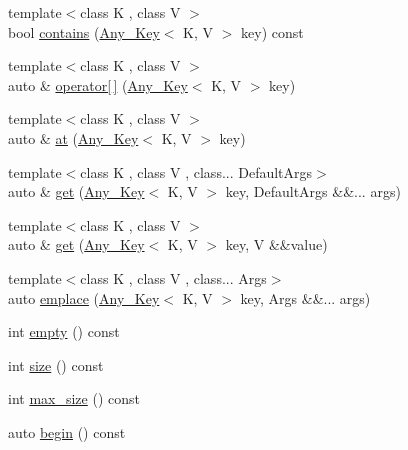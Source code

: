 \begin{DoxyCompactItemize}
\item 
{\footnotesize template$<$class K , class V $>$ }\\bool \hyperlink{classbc_1_1utility_1_1Any__Map_a63086bc45ee54ef2ca5ebc4dc0989332}{contains} (\hyperlink{structbc_1_1utility_1_1Any__Key}{Any\+\_\+\+Key}$<$ K, V $>$ key) const
\item 
{\footnotesize template$<$class K , class V $>$ }\\auto \& \hyperlink{classbc_1_1utility_1_1Any__Map_a8898f0b7810c617631176e8bafbd156d}{operator\mbox{[}$\,$\mbox{]}} (\hyperlink{structbc_1_1utility_1_1Any__Key}{Any\+\_\+\+Key}$<$ K, V $>$ key)
\item 
{\footnotesize template$<$class K , class V $>$ }\\auto \& \hyperlink{classbc_1_1utility_1_1Any__Map_aedde6d40e8c81b80d9f4f16a55c0fab2}{at} (\hyperlink{structbc_1_1utility_1_1Any__Key}{Any\+\_\+\+Key}$<$ K, V $>$ key)
\item 
{\footnotesize template$<$class K , class V , class... Default\+Args$>$ }\\auto \& \hyperlink{classbc_1_1utility_1_1Any__Map_a45119ffc4e78ca50dc4790c63cc42590}{get} (\hyperlink{structbc_1_1utility_1_1Any__Key}{Any\+\_\+\+Key}$<$ K, V $>$ key, Default\+Args \&\&... args)
\item 
{\footnotesize template$<$class K , class V $>$ }\\auto \& \hyperlink{classbc_1_1utility_1_1Any__Map_a14d3fe8ca3fc98def4e9b61d7aa082fa}{get} (\hyperlink{structbc_1_1utility_1_1Any__Key}{Any\+\_\+\+Key}$<$ K, V $>$ key, V \&\&value)
\item 
{\footnotesize template$<$class K , class V , class... Args$>$ }\\auto \hyperlink{classbc_1_1utility_1_1Any__Map_a3e953570d8899b5fdcc0d17a86df085d}{emplace} (\hyperlink{structbc_1_1utility_1_1Any__Key}{Any\+\_\+\+Key}$<$ K, V $>$ key, Args \&\&... args)
\item 
int \hyperlink{classbc_1_1utility_1_1Any__Map_a3ec5e27b12955483d9c44ac6ae3b657a}{empty} () const
\item 
int \hyperlink{classbc_1_1utility_1_1Any__Map_afb04f91ca1a089ac61df93cb86d9b9f8}{size} () const
\item 
int \hyperlink{classbc_1_1utility_1_1Any__Map_a69eeee0adc8cb8cdaeac754a7f81438c}{max\+\_\+size} () const
\item 
auto \hyperlink{classbc_1_1utility_1_1Any__Map_a2140500f599708a2eac39a6736df0c40}{begin} () const

\end{DoxyCompactItemize}

